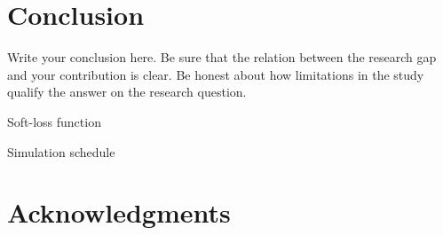 \section{Conclusion}
\label{sec:conclusion}
Write your conclusion here. Be sure that the relation between the research gap and your contribution is clear. Be honest about how limitations in the study qualify the answer on the research question.

Soft-loss function

Simulation schedule

\section{Acknowledgments}
\label{sec:conclusion}